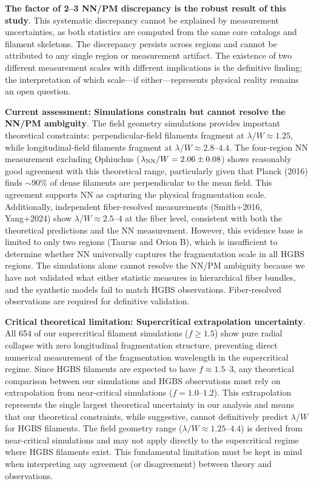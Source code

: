 \documentclass[twoside,twocolumn]{mnras}
\begin{document}
\textbf{The factor of 2--3 NN/PM discrepancy is the robust result of this study}. This systematic discrepancy cannot be explained by measurement uncertainties, as both statistics are computed from the same core catalogs and filament skeletons. The discrepancy persists across regions and cannot be attributed to any single region or measurement artifact. The existence of two different measurement scales with different implications is the definitive finding; the interpretation of which scale---if either---represents physical reality remains an open question.

\textbf{Current assessment: Simulations constrain but cannot resolve the NN/PM ambiguity}. The field geometry simulations provides important theoretical constraints: perpendicular-field filaments fragment at $\lambda/W \approx 1.25$, while longitudinal-field filaments fragment at $\lambda/W \approx 2.8$--$4.4$. The four-region NN measurement excluding Ophiuchus ($\lambda_{\rm NN}/W = 2.06 \pm 0.08$) shows reasonably good agreement with this theoretical range, particularly given that Planck (2016) finds $\sim$90\% of dense filaments are perpendicular to the mean field. This agreement supports NN as capturing the physical fragmentation scale. Additionally, independent fiber-resolved measurements (Smith+2016, Yang+2024) show $\lambda/W \approx 2.5$--$4$ at the fiber level, consistent with both the theoretical predictions and the NN measurement. However, this evidence base is limited to only two regions (Taurus and Orion B), which is insufficient to determine whether NN universally captures the fragmentation scale in all HGBS regions. The simulations alone cannot resolve the NN/PM ambiguity because we have not validated what either statistic measures in hierarchical fiber bundles, and the synthetic models fail to match HGBS observations. Fiber-resolved observations are required for definitive validation.

\textbf{Critical theoretical limitation: Supercritical extrapolation uncertainty}. All 654 of our supercritical filament simulations ($f \geq 1.5$) show pure radial collapse with zero longitudinal fragmentation structure, preventing direct numerical measurement of the fragmentation wavelength in the supercritical regime. Since HGBS filaments are expected to have $f \approx 1.5$--$3$, any theoretical comparison between our simulations and HGBS observations must rely on extrapolation from near-critical simulations ($f = 1.0$--$1.2$). This extrapolation represents the single largest theoretical uncertainty in our analysis and means that our theoretical constraints, while suggestive, cannot definitively predict $\lambda/W$ for HGBS filaments. The field geometry range ($\lambda/W \approx 1.25$--$4.4$) is derived from near-critical simulations and may not apply directly to the supercritical regime where HGBS filaments exist. This fundamental limitation must be kept in mind when interpreting any agreement (or disagreement) between theory and observations.
\end{document}
